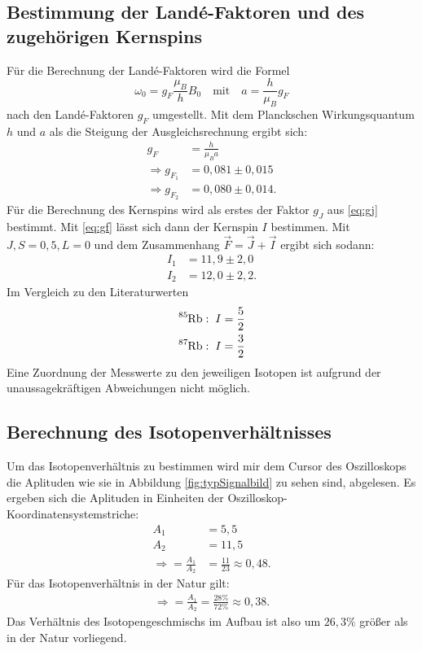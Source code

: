 \subsection{Bestimmung der Landé-Faktoren und des zugehörigen Kernspins}
Für die Berechnung der Landé-Faktoren wird die Formel
\begin{equation}
  \omega_0=g_F\frac{\mu_B}{h}B_0\quad \text{mit}\quad a=\frac{h}{\mu_B}{g_F}
\end{equation}
nach den Landé-Faktoren $g_F$ umgestellt. Mit dem Planckschen Wirkungsquantum $h$ und $a$ als die Steigung der Ausgleichsrechnung ergibt sich:
\begin{align*}
  g_F&=\frac{h}{\mu_Ba}\\
  \Rightarrow g_{F_1}&= 0,081 \pm 0,015\\
  \Rightarrow g_{F_2}&= 0,080 \pm 0,014.
\end{align*}
Für die Berechnung des Kernspins wird als erstes der Faktor $g_J$ aus \eqref{eq:gj} bestimmt. Mit \eqref{eq:gf} lässt sich dann der Kernspin $I$ bestimmen. Mit $J,S=0,5,L=0$ \cite{anleitung} und dem Zusammenhang $\vec{F}=\vec{J}+\vec{I}$ ergibt sich sodann:
\begin{align*}
  I_1&= 11,9\pm2,0\\
  I_2&=12,0\pm2,2.
\end{align*}
Im Vergleich zu den Literaturwerten \cite{rubidium}
\begin{align*}
  \ce{^{85}Rb}&:\; I=\frac{5}{2}\\
  \ce{^{87}Rb}&:\; I=\frac{3}{2}
\end{align*}
Eine Zuordnung der Messwerte zu den jeweiligen Isotopen ist aufgrund der unaussagekräftigen Abweichungen nicht möglich.
\subsection{Berechnung des Isotopenverhältnisses}
Um das Isotopenverhältnis zu bestimmen wird mir dem Cursor des Oszilloskops die Aplituden wie sie in Abbildung \ref{fig:typSignalbild} zu sehen sind, abgelesen.
Es ergeben sich die Aplituden in Einheiten der Oszilloskop-Koordinatensystemstriche:
\begin{align*}
A_1&= 5,5\\
A_2&= 11,5\\
\Rightarrow =\frac{A_1}{A_2}&=\frac{11}{23}\approx 0,48.
\end{align*}
Für das Isotopenverhältnis in der Natur gilt:
\begin{align*}
\Rightarrow =\frac{A_1}{A_2}=\frac{28\%}{72\%}\approx 0,38.
\end{align*}
Das Verhältnis des Isotopengeschmischs im Aufbau ist also um $26,3\%$ größer als in der Natur vorliegend.
